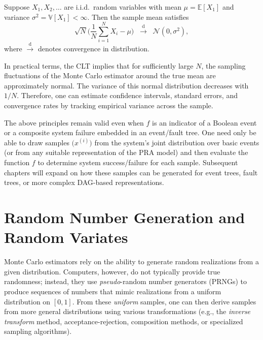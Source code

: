 \begin{theorem}
\label{thm:CLT}
Suppose \(X_1, X_2,\dots\) are i.i.d.\ random variables with mean \(\mu=\mathbb{E}[X_1]\) and variance \(\sigma^2=\mathbb{V}[X_1]<\infty\). Then the sample mean satisfies
\[
\sqrt{N}
\biggl(
 \frac{1}{N}\sum_{i=1}^N X_i - \mu
\biggr)
\;\;\xrightarrow{\mathrm{d}}\;\;
\mathcal{N}(0,\sigma^2),
\]
where \(\xrightarrow{\mathrm{d}}\) denotes convergence in distribution.
\end{theorem}

In practical terms, the CLT implies that for sufficiently large \(N\), the sampling fluctuations of the Monte Carlo estimator around the true mean are approximately normal. The variance of this normal distribution decreases with \(1/N\). Therefore, one can estimate confidence intervals, standard errors, and convergence rates by tracking empirical variance across the sample.

The above principles remain valid even when \(f\) is an indicator of a Boolean event or a composite system failure embedded in an event/fault tree. One need only be able to draw samples \(\bigl(x^{(i)}\bigr)\) from the system’s joint distribution over basic events (or from any suitable representation of the PRA model) and then evaluate the function \(f\) to determine system success/failure for each sample. Subsequent chapters will expand on how these samples can be generated for event trees, fault trees, or more complex DAG-based representations.

\section{Random Number Generation and Random Variates}
Monte Carlo estimators rely on the ability to generate random realizations from a given distribution. Computers, however, do not typically provide true randomness; instead, they use \emph{pseudo}-random number generators (PRNGs) to produce sequences of numbers that mimic realizations from a uniform distribution on \([0,1]\). From these \emph{uniform} samples, one can then derive samples from more general distributions using various transformations (e.g., the \emph{inverse transform} method, acceptance-rejection, composition methods, or specialized sampling algorithms).

